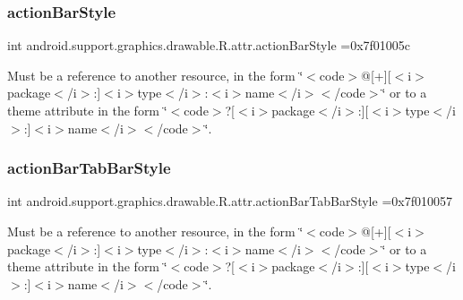 \subsubsection{\texorpdfstring{action\+Bar\+Style}{actionBarStyle}}
{\footnotesize\ttfamily int android.\+support.\+graphics.\+drawable.\+R.\+attr.\+action\+Bar\+Style =0x7f01005c\hspace{0.3cm}{\ttfamily [static]}}

Must be a reference to another resource, in the form \char`\"{}$<$code$>$@\mbox{[}+\mbox{]}\mbox{[}$<$i$>$package$<$/i$>$\+:\mbox{]}$<$i$>$type$<$/i$>$\+:$<$i$>$name$<$/i$>$$<$/code$>$\char`\"{} or to a theme attribute in the form \char`\"{}$<$code$>$?\mbox{[}$<$i$>$package$<$/i$>$\+:\mbox{]}\mbox{[}$<$i$>$type$<$/i$>$\+:\mbox{]}$<$i$>$name$<$/i$>$$<$/code$>$\char`\"{}. \mbox{\label{classandroid_1_1support_1_1graphics_1_1drawable_1_1R_1_1attr_a0cc70d5fcb3770f744cb04133c70f855}} 
\subsubsection{\texorpdfstring{action\+Bar\+Tab\+Bar\+Style}{actionBarTabBarStyle}}
{\footnotesize\ttfamily int android.\+support.\+graphics.\+drawable.\+R.\+attr.\+action\+Bar\+Tab\+Bar\+Style =0x7f010057\hspace{0.3cm}{\ttfamily [static]}}

Must be a reference to another resource, in the form \char`\"{}$<$code$>$@\mbox{[}+\mbox{]}\mbox{[}$<$i$>$package$<$/i$>$\+:\mbox{]}$<$i$>$type$<$/i$>$\+:$<$i$>$name$<$/i$>$$<$/code$>$\char`\"{} or to a theme attribute in the form \char`\"{}$<$code$>$?\mbox{[}$<$i$>$package$<$/i$>$\+:\mbox{]}\mbox{[}$<$i$>$type$<$/i$>$\+:\mbox{]}$<$i$>$name$<$/i$>$$<$/code$>$\char`\"{}. \mbox{\label{classandroid_1_1support_1_1graphics_1_1drawable_1_1R_1_1attr_adccf1f2c165270f717de0a35385fdeb2}} 
